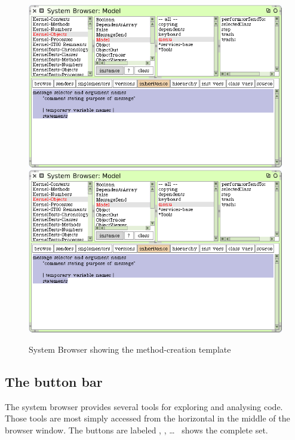 \documentclass[a4paper,10pt,twoside]{book}
\begin{document}
\begin{figure}[htbp]
   \centering
   \ifluluelse
	   {\includegraphics [width=\textwidth]{SystemBrowserMethodTemplate}}
	   {\includegraphics[scale=.7]{SystemBrowserMethodTemplate}}
   \caption{System Browser showing the method-creation template
   \label{fig:SystemBrowserMethodTemplate}}
\end{figure}

\subsection{The button bar}
\label{sec:ButtonBar}

The system browser provides several tools for exploring and analysing code. Those tools are most simply accessed from the horizontal  in the middle of the browser window.  The buttons are labeled , , \ldots{}\ %
 shows the complete set.
\end{document}
